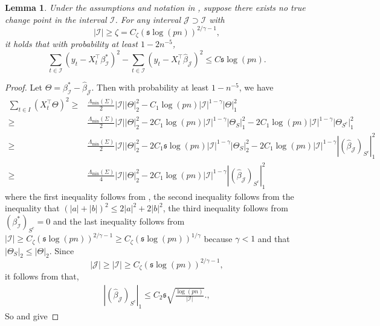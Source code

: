 \documentclass[11pt]{article}
\newcommand{\I}{{\mathcal I }}
\newcommand{\J}{{  \mathcal J } }
\newcommand{\s}{ { \mathfrak{s}  } }
\theoremstyle{plain}
\newtheorem{lemma}[theorem]{Lemma}
\theoremstyle{definition}
\begin{document}
 
 
\begin{lemma} \label{lem-case-5-prop-2-needed}
Under the assumptions and notation in , suppose there exists no true change point in the interval $\I$.   For any interval $\mathcal J \supset \I$ with 
$$ | \I | \ge \zeta  = C_\zeta ( \s \log(pn) )^{2/\gamma -1 } , $$
	  it holds that with probability at least $1 -  2n^{-5}$,
	$$
		\sum_{t \in \I} (y_t - X _t^{\top} \beta^*_\I)^2 - \sum_{t \in \I} (y_t - X_t^{\top} \widehat{\beta} _\J)^2 \leq C \s \log(pn).
	$$
\end{lemma}
 
\begin{proof} 
	Let $\Theta  = \beta^*_\I  -\widehat \beta _\J$. Then with probability at least $ 1-n^{-5}$, we have
	\begin{align}
		   \sum_{t \in I} (X_t^{\top} \Theta  )^2  \geq & \frac{\Lambda_{\min} (\Sigma) }{2}  |\I|   |\Theta    |_2 ^2  - C_1  \log(pn)  |\I|^{1-\gamma } |\Theta  |_1^2  \nonumber \\
		\geq &  \frac{\Lambda_{\min} (\Sigma) }{2}   |\I|  |\Theta  |_2^2  -  2C_1  \log(pn)  |\I|^{1-\gamma } |\Theta _S   |_1 ^2 - 2C_1  \log(pn)  |\I|^{1-\gamma } |\Theta _{S^c } |_1^2  \nonumber \\
		\geq &  \frac{\Lambda_{\min} (\Sigma) }{2}   |\I|  |\Theta  |_2^2  -  2C_1\s    \log(pn)  |\I|^{1-\gamma } |\Theta _S   |_2 ^2 - 2C_1   \log(pn)  |\I|^{1-\gamma } | ( \widehat \beta _{\J} )   _{S^c } |_1^2 \nonumber \\ 
		\geq &  \frac{\Lambda_{\min} (\Sigma) }{4}   |\I|  |\Theta  |_2 ^2 - 2C_1   \log(pn)  |\I|^{1-\gamma } | ( \widehat \beta _{\J} )   _{S^c } |_1^2
		\label{eq-lem16-pf-1-1}
	\end{align} 
	where the first inequality follows from , the  second inequality follows from the inequality that $(|a| + |b|)^2 \leq 2|a|^2+2|b|^2$, the third inequality follows from $(\beta_\I^* )_{S^c} = 0 $  and the  last inequality follows from $| \I | \ge  C_\zeta ( \s \log(pn) )^{2/\gamma -1 } \ge  C_\zeta(\s\log(pn) )^{1/\gamma}$ because $ \gamma<1$ and that $|\Theta_S|_2 \le |\Theta|_2$. 
Since $$|\J| \ge |\I| \ge  C_\zeta ( \s \log(pn) )^{2/\gamma -1 }, $$	
	it follows from   that,
	\begin{align} | ( \widehat \beta _{\J} )   _{S^c } |_1  \le C_2 \s \sqrt { \frac{\log(pn) }{|\I| }}.\label{eq-lem16-pf-01},
	\end{align}  
So   and  give  

\end{proof}
\end{document}
